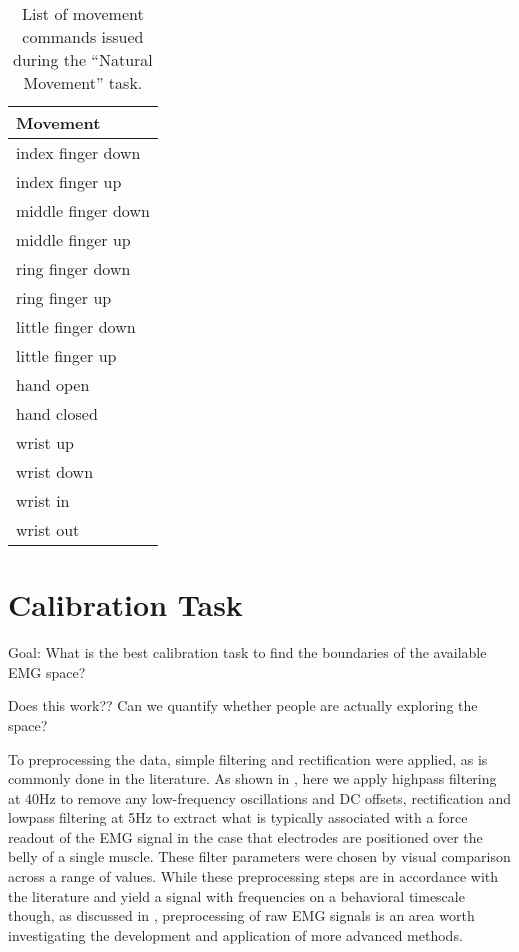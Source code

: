 \documentclass[../main.tex]{subfiles}
\begin{document}
\begin{table}[H]
  \begin{center}
      \caption[List of movement commands]{List of movement commands issued during the ``Natural Movement'' task.}\label{tab:movement_commands}
      \begin{tabular}{l}
          Movement \\ 
          \hline
          index finger down \\ 
          index finger up \\ 
          middle finger down \\ 
          middle finger up \\ 
          ring finger down \\ 
          ring finger up \\ 
          little finger down \\ 
          little finger up \\ 
          hand open \\ 
          hand closed \\ 
          wrist up \\ 
          wrist down \\ 
          wrist in \\ 
          wrist out \\ 
      \end{tabular}
  \end{center}
\end{table}


\section{Calibration Task}

Goal: What is the best calibration task to find the boundaries of the available EMG space? 

Does this work?? Can we quantify whether people are actually exploring the space?

To preprocessing the data, simple filtering and rectification were applied, as is commonly done in the literature\cite{@sangerBayesianFilteringMyoelectric2007;@churchlandNeuralPopulationDynamics2012a;@churchlandNeuralVariabilityPremotor2006;@sussillo2015}. As shown in , here we apply highpass filtering at 40Hz to remove any low-frequency oscillations and DC offsets, rectification and lowpass filtering at 5Hz to extract what is typically associated with a force readout of the EMG signal in the case that electrodes are positioned over the belly of a single muscle. These filter parameters were chosen by visual comparison across a range of values. While these preprocessing steps are in accordance with the literature and yield a signal with frequencies on a behavioral timescale though, as discussed in , preprocessing of raw EMG signals is an area worth investigating the development and application of more advanced methods.
\end{document}
